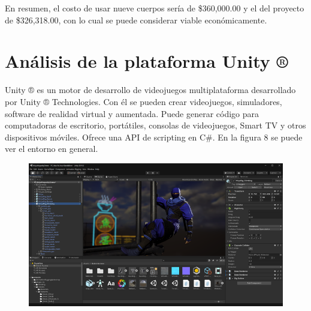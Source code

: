 En resumen, el costo de usar nueve cuerpos sería de \$360,000.00 y el del proyecto de \$326,318.00, con lo cual se puede considerar viable económicamente.

\section{Análisis de la plataforma Unity ®}
Unity ® es un motor de desarrollo de videojuegos multiplataforma desarrollado por Unity ® Technologies. Con él se pueden crear videojuegos, simuladores, software de realidad virtual y aumentada. Puede generar código para computadoras de escritorio, portátiles, consolas de videojuegos, Smart TV y otros dispositivos móviles. Ofrece una API de scripting en C\#. En la figura 8 se puede ver el entorno en general.\\
\begin{figure}[H]
	\begin{center}
 		\includegraphics[width = 1\textwidth]{source/images/image33.png}
	\end{center} 
\end{figure}

